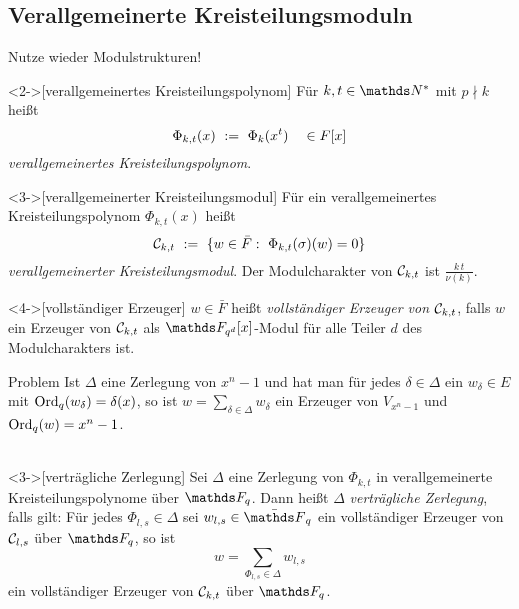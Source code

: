 \documentclass{vorlage}
\begin{document}
\subsection{Verallgemeinerte Kreisteilungsmoduln}

\begin{frame}
   Nutze wieder Modulstrukturen!
  \begin{definition}<2->[verallgemeinertes Kreisteilungspolynom]
    Für $k,t \in \N^\ast$ mit $p\nmid k$ heißt 
    \[ \Phi_{k,t}(x) \ :=\  \Phi_k(x^t) \quad \in F[x]\]
    \emph{verallgemeinertes Kreisteilungspolynom}.
  \end{definition}
  \begin{definition}<3->[verallgemeinerter Kreisteilungsmodul]
    Für ein verallgemeinertes Kreisteilungspolynom $\Phi_{k,t}(x)$ heißt
    \[ \C_{k,t} \speq{:=} \{ w \in \bar F:\ \Phi_{k,t}(\sigma)(w) = 0\}\]
    \emph{verallgemeinerter Kreisteilungsmodul}.
    Der Modulcharakter von $\mathcal{C}_{k,t}$ ist $\frac{k\,t}{\nu(k)}$.
  \end{definition}
  \begin{definition}<4->[vollständiger Erzeuger]
    $w \in \bar F$ heißt \emph{vollständiger Erzeuger von $\mathcal{C}_{k,t}$}, falls
    $w$ ein Erzeuger von $\mathcal{C}_{k,t}$ als $\F_{q^d}[x]$-Modul für alle 
    Teiler $d$ des Modulcharakters ist.
  \end{definition}
\end{frame}



\begin{frame}{Problem}
   Ist $\Delta$ eine Zerlegung von $x^n-1$ und
  hat man für jedes $\delta\in\Delta$ ein
  $w_\delta\in E$ mit $\operatorname{Ord}_q(w_\delta) = \delta(x)$, so 
  ist $w = \sum_{\delta\in \Delta} w_\delta$ ein
  Erzeuger von $V_{x^n-1}$ und 
  $\operatorname{Ord}_q(w) = x^n-1$.\\~\\


  \begin{definition}<3->[verträgliche Zerlegung]
    Sei $\Delta$ eine Zerlegung von $\Phi_{k,t}$ in verallgemeinerte
    Kreisteilungspolynome über $\F_q$.
    Dann heißt $\Delta$ 
    \emph{verträgliche Zerlegung}, falls gilt: Für jedes 
    $\Phi_{l,s} \in \Delta$ sei
    $w_{l,s} \in \bar \F_q$ ein vollständiger Erzeuger von 
    $\mathcal{C}_{l,s}$ über $\F_q$,
    so ist 
    \[ w = \sum_{\Phi_{l,s} \in \Delta} w_{l,s} \]
    ein vollständiger Erzeuger von $\mathcal{C}_{k,t}$ über $\F_q$.
  \end{definition}
\end{frame}
\end{document}
